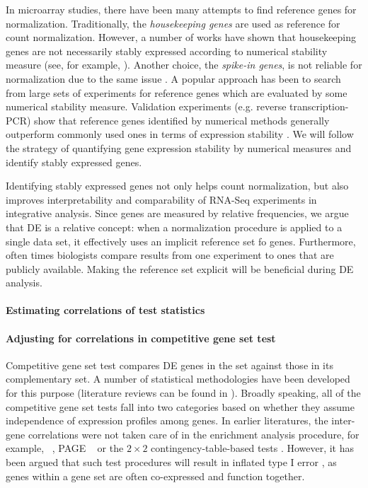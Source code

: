 In microarray studies, there have been many attempts to find reference genes for normalization.
Traditionally, the \textit{housekeeping genes}  are used as reference for count normalization.
However, a number of works have shown that housekeeping genes are not necessarily stably expressed
according to numerical stability measure (see, for example,
\cite{czechowski2005genome,huggett2005real}). Another choice, the \textit{spike-in genes}, is not
reliable for normalization due to the same issue \citep{risso2014nat}. A popular approach has been
to search from large sets of experiments for reference genes
\citep{czechowski2005genome,dekkers2012identification,frericks2008toolbox,gur2009identification,stamova2009identification}
which are evaluated by some numerical stability measure. Validation experiments (e.g. reverse
transcription-PCR) show that reference genes identified by numerical methods generally outperform
commonly used ones in terms of expression stability \citep{czechowski2005genome,hruz2011refgenes}.
We will follow the strategy of quantifying gene expression stability by numerical measures and
identify stably expressed genes.

Identifying stably expressed genes not only helps count normalization, but also improves
interpretability and comparability of RNA-Seq experiments in integrative analysis. Since genes are
measured by relative frequencies, we argue that DE is a relative concept: when a normalization
procedure is applied to a single data set, it effectively uses an implicit reference set fo genes.
Furthermore, often times biologists compare results from one experiment to ones that are publicly
available. Making the reference set explicit will be beneficial during DE analysis. 

\paragraph{Estimating correlations of test statistics}

\paragraph{Adjusting for correlations in competitive gene set test}
Competitive gene set test compares DE genes in the set against those in its complementary set. A
number of
statistical methodologies have been developed for this purpose (literature reviews can be found in
\cite{huang2009bioinformatics,khatri2012ten, mishra2014gene}). Broadly speaking, all of the
competitive gene set tests fall into two categories based on whether they assume independence of
expression profiles among genes. In earlier literatures, the inter-gene correlations were not taken
care of in the enrichment analysis procedure, for example, \gent~\citep{tian2005discovering}, PAGE
\citep{kim2005page} \genr~\citep{michaud2008integrative} or the $2\times 2$ contingency-table-based
tests \cite{alexa2010topgo, huang2007david,ye2006wego}. However, it has been argued that such test
procedures will result in inflated type I error \citep{efron2007testing,goeman2007analyzing,
	gatti2010heading,wu2012camera,yaari2013quantitative}, as genes within a gene set are often
co-expressed and function together.

